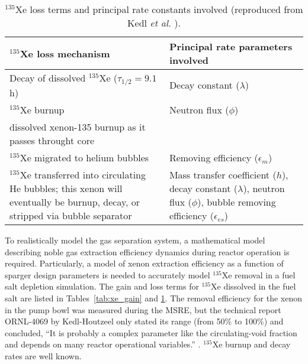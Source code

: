 \begin{table}[b]
	\caption{$^{135}$Xe loss terms and principal rate constants involved
		(reproduced from Kedl \emph{et al.} \cite{kedl_development_1967}).}
	\centering
	\begin{tabularx}{\textwidth}{b b}
		\hline \textbf{$^{135}$Xe loss mechanism}      & \textbf{Principal 
		rate 
			parameters involved}  	\\
		\hline Decay of dissolved $^{135}$Xe ($\tau_{1/2}=9.1$ h)  & Decay 
		constant	($\lambda$)		\\
		\hline $^{135}$Xe burnup              &  Neutron flux 
		($\phi$)		 					\\
		dissolved xenon-135 burnup as it passes throught core  
		& 			            \\		\hline $^{135}$Xe migrated to 
		helium bubbles & Removing efficiency 
		($\epsilon_m$)		\\
		\hline $^{135}$Xe transferred into circulating He bubbles; this xenon 
		will eventually be burnup, decay, or stripped via bubble separator & 
		Mass transfer coefficient ($h$), decay constant ($\lambda$), 
		neutron flux ($\phi$), bubble removing efficiency 
		($\epsilon_{es}$)		\\
		\hline 
	\end{tabularx}
	\label{tab:xe_loss}
\end{table}

To realistically model the gas separation system, a mathematical model 
describing noble gas extraction efficiency dynamics during reactor operation 
is required. Particularly, a model of xenon extraction efficiency as a 
function of sparger design parameters is needed to accurately model 
$^{135}$Xe removal in a fuel salt depletion simulation. The gain and loss 
terms for $^{135}$Xe dissolved in the fuel salt are listed in 
Tables~\ref{tab:xe_gain} and \ref{tab:xe_loss}. The removal efficiency for 
the xenon in the pump bowl was measured during the \gls{MSRE}, but the  
technical report ORNL-4069 by Kedl-Houtzeel only stated its range (from 50\% 
to 100\%) and concluded, ``It is probably a complex parameter like the 
circulating-void fraction and depends on many reactor operational variables.'' 
\cite{kedl_development_1967}. $^{135}$Xe burnup and decay rates are well 
known. 

